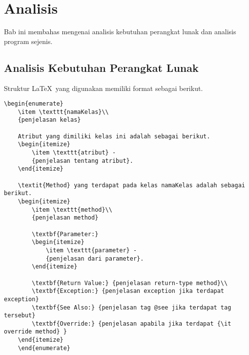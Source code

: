 \lstset{style=mystyle}
\chapter{Analisis}
\label{sec:analisis}

Bab ini membahas mengenai analisis kebutuhan perangkat lunak dan analisis program sejenis.

\section{Analisis Kebutuhan Perangkat Lunak}
\label{sec:analisis}

Struktur \LaTeX\ yang digunakan memiliki format sebagai berikut.
\begin{lstlisting}[caption=Potongan kode \LaTeX, label={kode-latex}]
	\begin{enumerate}
	\item \texttt{namaKelas}\\
	{penjelasan kelas}
	
	Atribut yang dimiliki kelas ini adalah sebagai berikut.
	\begin{itemize}
		\item \texttt{atribut} -
		{penjelasan tentang atribut}.
	\end{itemize}
	
	\textit{Method} yang terdapat pada kelas namaKelas adalah sebagai berikut.
	\begin{itemize}
		\item \texttt{method}\\
		{penjelasan method}
		
		\textbf{Parameter:}
		\begin{itemize}
			\item \texttt{parameter} - 
			{penjelasan dari parameter}.
		\end{itemize}
		
		\textbf{Return Value:} {penjelasan return-type method}\\
		\textbf{Exception:} {penjelasan exception jika terdapat exception}
		\textbf{See Also:} {penjelasan tag @see jika terdapat tag tersebut}
		\textbf{Override:} {penjelasan apabila jika terdapat {\it override method} }
	\end{itemize}
	\end{enumerate}
\end{lstlisting}

